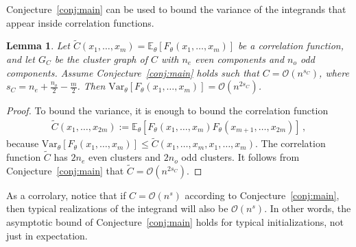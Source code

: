 \documentclass[english]{article}
\newtheorem{lemma}{Lemma}
\newcommand{\cO}{\ensuremath{\mathcal{O}}}
\newcommand{\lexpp}[1]{\mathbb{E}_{#1}\left[}
\newcommand{\rexp}{\right]}
\begin{document}
Conjecture~\ref{conj:main} can be used to bound the variance of the integrands that appear inside correlation functions.
\begin{lemma}\label{lemma:variance}
  Let $\tilde{C}(x_1,\dots,x_{m}) = \lexpp{\theta} F_\theta(x_1,\dots,x_m) \rexp$ be a correlation function, and let $G_C$ be the cluster graph of $C$ with $n_e$ even components and $n_o$ odd components.
  Assume Conjecture~\ref{conj:main} holds such that $C = \cO(n^{s_C})$, where $s_C = n_e + \frac{n_o}{2} - \frac{m}{2}$.
  Then $\mathrm{Var}_\theta \left[ F_\theta(x_1,\dots,x_m) \right] = \cO(n^{2s_C})$.
\end{lemma}
\begin{proof}
  To bound the variance, it is enough to bound the correlation function
  \begin{align}
    \tilde{C}(x_1,\dots,x_{2m}) := \lexpp{\theta} F_\theta(x_1,\dots,x_m) F_\theta(x_{m+1},\dots,x_{2m}) \rexp
    \,,
  \end{align}
  because $\mathrm{Var}_\theta \left[ F_\theta(x_1,\dots,x_m) \right] \le \tilde{C}(x_1,\dots,x_m,x_1,\dots,x_m)$.
  The correlation function $\tilde{C}$ has $2n_e$ even clusters and $2n_o$ odd clusters.
  It follows from Conjecture~\ref{conj:main} that $\tilde{C} = \cO(n^{2s_C})$.
\end{proof}
As a corrolary, notice that if $C = \cO(n^{s})$ according to Conjecture~\ref{conj:main}, then typical realizations of the integrand will also be $\cO(n^s)$.
In other words, the asymptotic bound of Conjecture~\ref{conj:main} holds for typical initializations, not just in expectation.
\end{document}
